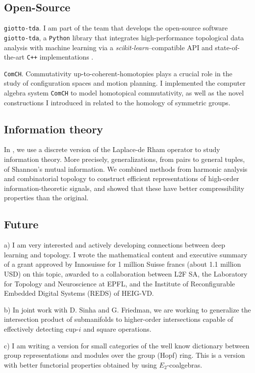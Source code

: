 \subsection{Open-Source} \label{ssec: giotto-tda}
\texttt{giotto-tda}. I am part of the team that develops the open-source software \texttt{giotto-tda}, a \texttt{Python} library that integrates high-performance topological data analysis with machine learning via a \emph{scikit-learn}--compatible API and state-of-the-art \texttt{C++} implementations \cite{medina2021giotto}.

\texttt{ComCH}. Commutativity up-to-coherent-homotopies plays a crucial role in the study of configuration spaces and motion planning. I implemented the computer algebra system \texttt{ComCH} to model homotopical commutativity, as well as the novel constructions I introduced in \cite{medina2020maysteenrod} related to the homology of symmetric groups.

\subsection{Information theory}
In \cite{medina2021hyperharmonic}, we use a discrete version of the Laplace-de Rham operator to study information theory. More precisely, generalizations, from pairs to general tuples, of Shannon's mutual information. We combined methods from harmonic analysis and combinatorial topology to construct efficient representations of high-order information-theoretic signals, and showed that these have better compressibility properties than the original.

\subsection{Future}
a) I am very interested and actively developing connections between deep learning and topology. I wrote the mathematical content and executive summary of a grant approved by Innosuisse for 1 million Suisse francs (about 1.1 million USD) on this topic, awarded to a collaboration between L2F SA, the Laboratory for Topology and Neuroscience at EPFL, and the Institute of Reconfigurable Embedded Digital Systems (REDS) of HEIG-VD.

b) In joint work with D. Sinha and G. Friedman, we are working to generalize the intersection product of submanifolds to higher-order intersections capable of effectively detecting cup-$i$ and square operations.

c) I am writing a version for small categories of the well know dictionary between group representations and modules over the group (Hopf) ring. This is a version with better functorial properties obtained by using $E_2$-coalgebras.

